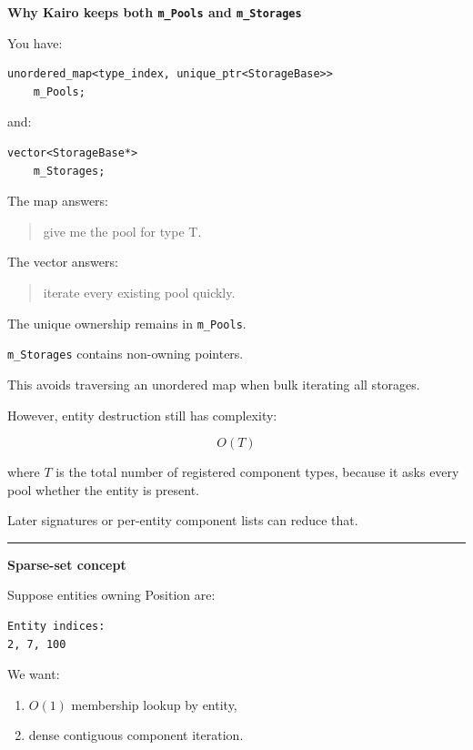 \textbf{Why Kairo keeps both \texttt{m\_Pools} and \texttt{m\_Storages}}

You have:

\begin{verbatim}
unordered_map<type_index, unique_ptr<StorageBase>>
    m_Pools;
\end{verbatim}

and:

\begin{verbatim}
vector<StorageBase*>
    m_Storages;
\end{verbatim}

The map answers:

\begin{quote}
give me the pool for type T.
\end{quote}

The vector answers:

\begin{quote}
iterate every existing pool quickly.
\end{quote}

The unique ownership remains in \texttt{m\_Pools}.

\texttt{m\_Storages} contains non-owning pointers.

This avoids traversing an unordered map when bulk iterating all storages.

However, entity destruction still has complexity:

\[
O(T)
\]

where \(T\) is the total number of registered component types, because it asks every pool whether the entity is present.

Later signatures or per-entity component lists can reduce that.

\begin{center}\rule{0.5\linewidth}{0.5pt}\end{center}

\textbf{Sparse-set concept}

Suppose entities owning Position are:

\begin{verbatim}
Entity indices:
2, 7, 100
\end{verbatim}

We want:

\begin{enumerate}
\def\labelenumi{\arabic{enumi}.}
\tightlist
\item
  \(O(1)\) membership lookup by entity,
\item
  dense contiguous component iteration.
\end{enumerate}

